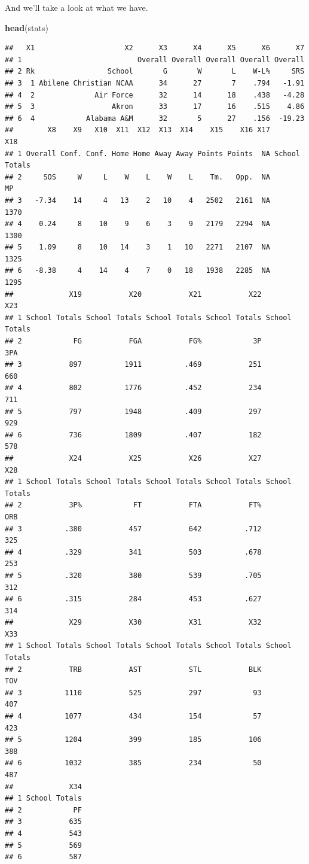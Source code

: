 \documentclass[]{book}
\newenvironment{Shaded}{\begin{snugshade}}{\end{snugshade}}
\newcommand{\KeywordTok}[1]{\textcolor[rgb]{0.13,0.29,0.53}{\textbf{#1}}}
\newcommand{\NormalTok}[1]{#1}
\begin{document}
And we'll take a look at what we have.

\begin{Shaded}
\begin{Highlighting}[]
\KeywordTok{head}\NormalTok{(stats)}
\end{Highlighting}
\end{Shaded}

\begin{verbatim}
##   X1                     X2      X3      X4      X5      X6      X7
## 1                           Overall Overall Overall Overall Overall
## 2 Rk                 School       G       W       L    W-L%     SRS
## 3  1 Abilene Christian NCAA      34      27       7    .794   -1.91
## 4  2              Air Force      32      14      18    .438   -4.28
## 5  3                  Akron      33      17      16    .515    4.86
## 6  4            Alabama A&M      32       5      27    .156  -19.23
##        X8    X9   X10  X11  X12  X13  X14    X15    X16 X17           X18
## 1 Overall Conf. Conf. Home Home Away Away Points Points  NA School Totals
## 2     SOS     W     L    W    L    W    L    Tm.   Opp.  NA            MP
## 3   -7.34    14     4   13    2   10    4   2502   2161  NA          1370
## 4    0.24     8    10    9    6    3    9   2179   2294  NA          1300
## 5    1.09     8    10   14    3    1   10   2271   2107  NA          1325
## 6   -8.38     4    14    4    7    0   18   1938   2285  NA          1295
##             X19           X20           X21           X22           X23
## 1 School Totals School Totals School Totals School Totals School Totals
## 2            FG           FGA           FG%            3P           3PA
## 3           897          1911          .469           251           660
## 4           802          1776          .452           234           711
## 5           797          1948          .409           297           929
## 6           736          1809          .407           182           578
##             X24           X25           X26           X27           X28
## 1 School Totals School Totals School Totals School Totals School Totals
## 2           3P%            FT           FTA           FT%           ORB
## 3          .380           457           642          .712           325
## 4          .329           341           503          .678           253
## 5          .320           380           539          .705           312
## 6          .315           284           453          .627           314
##             X29           X30           X31           X32           X33
## 1 School Totals School Totals School Totals School Totals School Totals
## 2           TRB           AST           STL           BLK           TOV
## 3          1110           525           297            93           407
## 4          1077           434           154            57           423
## 5          1204           399           185           106           388
## 6          1032           385           234            50           487
##             X34
## 1 School Totals
## 2            PF
## 3           635
## 4           543
## 5           569
## 6           587
\end{verbatim}
\end{document}
